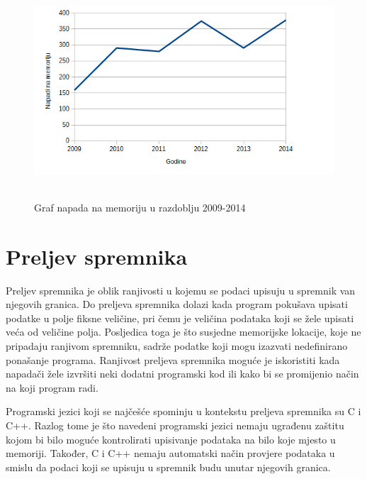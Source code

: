\documentclass[times, utf8, diplomski, numeric]{fer}
\begin{document}
\begin{figure}[!ht]
\centering
\setlength\fboxsep{0pt}
\setlength\fboxrule{0.5pt}
\includegraphics[width=12cm, height=8cm]{slike/memory_corruption}
\caption{Graf napada na memoriju u razdoblju 2009-2014}
\label{fig:mem_corruption} 
\end{figure} 

\section{Preljev spremnika}
\label{sct:bufferOverflow}

Preljev spremnika je oblik ranjivosti u kojemu se podaci upisuju
u spremnik van njegovih granica. Do preljeva spremnika dolazi
kada program pokušava upisati podatke u polje fiksne veličine,
pri čemu je veličina podataka koji se žele upisati veća od
veličine polja. Posljedica toga je što susjedne memorijske
lokacije, koje ne pripadaju ranjivom spremniku, sadrže podatke
koji mogu izazvati nedefinirano ponašanje programa. Ranjivost				%
preljeva spremnika moguće je iskoristiti kada napadači žele				%
izvršiti neki dodatni programski kod ili kako bi se promijenio				%
način na koji program radi. 

Programski jezici koji se najčešće spominju u kontekstu preljeva
spremnika su C i C++. Razlog tome je što navedeni programski
jezici nemaju ugrađenu zaštitu kojom bi bilo moguće kontrolirati				%
upisivanje podataka na bilo koje mjesto u memoriji. Također, C i
C++ nemaju automatski način provjere podataka u smislu da podaci
koji se upisuju u spremnik budu unutar njegovih granica.
\end{document}

